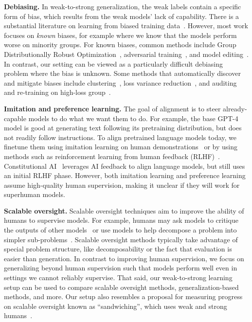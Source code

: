 \textbf{Debiasing.}\quad 
In weak-to-strong generalization, the weak labels contain a specific form of bias, which results from the weak models' lack of capability. There is a substantial literature on learning from biased training data~\citep{bellamy2018ai}. However, most work focuses on \emph{known} biases, for example where we know that the models perform worse on minority groups. For known biases, common methods include Group Distributionally Robust Optimization~\citep{sagawa2019distributionally}, adversarial training~\citep{zhang2018mitigating}, and model editing~\citep{santurkar2021editing, meng2022locating}. In contrast, our setting can be viewed as a particularly difficult debiasing problem where the bias is unknown. Some methods that automatically discover and mitigate biases include clustering~\citep{sohoni2020no}, loss variance reduction~\citep{khani2019maximum}, and auditing and re-training on high-loss group~\citep{kim2019multiaccuracy, liu2021just}.

\textbf{Imitation and preference learning.}\quad 
The goal of alignment is to steer already-capable models to do what we want them to do. For example, the base GPT-4 model is good at generating text following its pretraining distribution, but does not readily follow instructions. To align pretrained language models today, we finetune them using imitation learning on human demonstrations~\citep{bain1995framework,atkeson1997robot} or by using methods such as reinforcement learning from human feedback (RLHF)~\citep{christiano2017deep,stiennon2020learning,ouyang2022training,glaese2022improving,bai2022training}. Constitutional AI~\citep{bai2022constitutional, lee2023rlaif} leverages AI feedback to align language models, but still uses an initial RLHF phase. However, both imitation learning and preference learning assume high-quality human supervision, making it unclear if they will work for superhuman models.

\textbf{Scalable oversight.}\quad 
Scalable oversight techniques aim to improve the ability of humans to supervise models. For example, humans may ask models to critique the outputs of other models~\citep{irving2018ai,saunders2022self} or use models to help decompose a problem into simpler sub-problems~\citep{leike2018scalable,christiano2018supervising,lightman2023let}. Scalable oversight methods typically take advantage of special problem structure, like decomposability or the fact that evaluation is easier than generation. In contrast to improving human supervision, we focus on generalizing beyond human supervision such that models perform well even in settings we cannot reliably supervise. That said, our weak-to-strong learning setup can be used to compare scalable oversight methods, generalization-based methods, and more. Our setup also resembles a proposal for measuring progress on scalable oversight known as ``sandwiching'', which uses weak and strong humans~\citep{cotra2021sandwiching,bowman2022alignment}.

